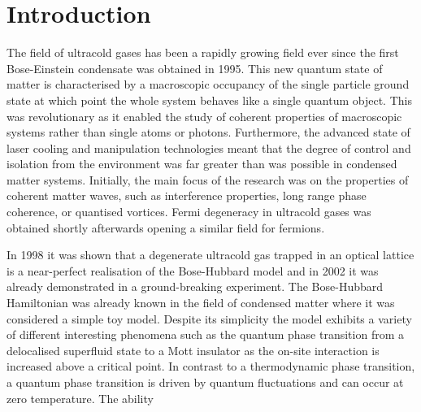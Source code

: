 
\chapter{Introduction}  %

\ifpdf
    \graphicspath{{Chapter1/Figs/Raster/}{Chapter1/Figs/PDF/}{Chapter1/Figs/}}
\else
    \graphicspath{{Chapter1/Figs/Vector/}{Chapter1/Figs/}}
\fi


The field of ultracold gases has been a rapidly growing field ever
since the first Bose-Einstein condensate was obtained in 1995. This
new quantum state of matter is characterised by a macroscopic
occupancy of the single particle ground state at which point the whole
system behaves like a single quantum object. This was revolutionary as
it enabled the study of coherent properties of macroscopic systems
rather than single atoms or photons. Furthermore, the advanced state
of laser cooling and manipulation technologies meant that the degree
of control and isolation from the environment was far greater than was
possible in condensed matter systems. Initially, the main focus of the
research was on the properties of coherent matter waves, such as
interference properties, long range phase coherence, or quantised
vortices. Fermi degeneracy in ultracold gases was obtained shortly
afterwards opening a similar field for fermions.

In 1998 it was shown that a degenerate ultracold gas trapped in an
optical lattice is a near-perfect realisation of the Bose-Hubbard
model and in 2002 it was already demonstrated in a ground-breaking
experiment. The Bose-Hubbard Hamiltonian was already known in the
field of condensed matter where it was considered a simple toy
model. Despite its simplicity the model exhibits a variety of
different interesting phenomena such as the quantum phase transition
from a delocalised superfluid state to a Mott insulator as the on-site
interaction is increased above a critical point. In contrast to a
thermodynamic phase transition, a quantum phase transition is driven
by quantum fluctuations and can occur at zero temperature. The ability 





